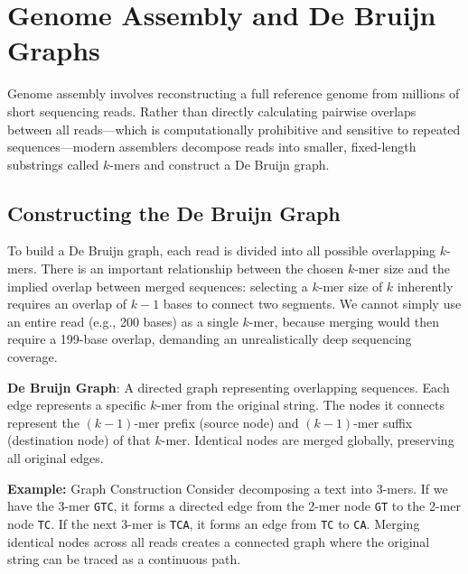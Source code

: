 \documentclass{article}
\begin{document}

\section{Genome Assembly and De Bruijn Graphs}

Genome assembly involves reconstructing a full reference genome from millions of short sequencing reads. Rather than directly calculating pairwise overlaps between all reads—which is computationally prohibitive and sensitive to repeated sequences—modern assemblers decompose reads into smaller, fixed-length substrings called $k$-mers and construct a De Bruijn graph.

\subsection{Constructing the De Bruijn Graph}

To build a De Bruijn graph, each read is divided into all possible overlapping $k$-mers. There is an important relationship between the chosen $k$-mer size and the implied overlap between merged sequences: selecting a $k$-mer size of $k$ inherently requires an overlap of $k-1$ bases to connect two segments. We cannot simply use an entire read (e.g., 200 bases) as a single $k$-mer, because merging would then require a 199-base overlap, demanding an unrealistically deep sequencing coverage.

\begin{important}
    \textbf{De Bruijn Graph}: A directed graph representing overlapping sequences. Each edge represents a specific $k$-mer from the original string. The nodes it connects represent the $(k-1)$-mer prefix (source node) and $(k-1)$-mer suffix (destination node) of that $k$-mer. Identical nodes are merged globally, preserving all original edges.
\end{important}

\textbf{Example:} Graph Construction
Consider decomposing a text into 3-mers. If we have the 3-mer \texttt{GTC}, it forms a directed edge from the 2-mer node \texttt{GT} to the 2-mer node \texttt{TC}. If the next 3-mer is \texttt{TCA}, it forms an edge from \texttt{TC} to \texttt{CA}. Merging identical nodes across all reads creates a connected graph where the original string can be traced as a continuous path.

\end{document}
